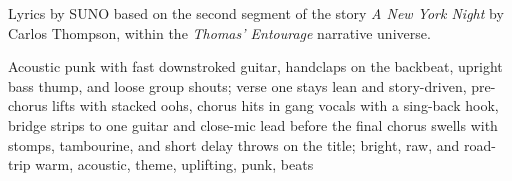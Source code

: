 
\begin{notes}
Lyrics by SUNO based on the second segment of the story \emph{A New York Night} by Carlos Thompson, %
within the \emph{Thomas’ Entourage} narrative universe.
\end{notes}
\begin{style}
Acoustic punk with fast downstroked guitar, handclaps on the backbeat, upright bass thump, and loose group shouts; verse one stays lean and story-driven, pre-chorus lifts with stacked oohs, chorus hits in gang vocals with a sing-back hook, bridge strips to one guitar and close-mic lead before the final chorus swells with stomps, tambourine, and short delay throws on the title; bright, raw, and road-trip warm, acoustic, theme, uplifting, punk, beats
\end{style}
